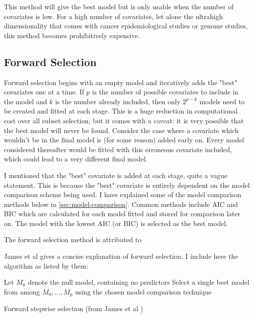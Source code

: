 This method will give the best model but is only usable when the number of covariates is low. For a high number of covariates, let alone the ultrahigh dimensionality that comes with cancer epidemiological studies or genome studies, this method becomes prohibitively expensive.

\subsection{Forward Selection}

Forward selection begins with an empty model and iteratively adds the "best" covariates one at a time. If $p$ is the number of possible covariates to include in the model and $k$ is the number already included, then only $2^{p-k}$ models need to be created and fitted at each stage. This is a huge reduction in computational cost over all subset selection, but it comes with a caveat: it is very possible that the best model will never be found. Consider the case where a covariate which wouldn't be in the final model is (for some reason) added early on. Every model considered thereafter would be fitted with this erroneous covariate included, which could lead to a very different final model.

I mentioned that the "best" covariate is added at each stage, quite a vague statement. This is because the "best" covariate is entirely dependent on the model comparison scheme being used. I have explained some of the model comparison methods below in \cref{sec:model-comparison}. Common methods include AIC and BIC which are calculated for each model fitted and stored for comparison later on. The model with the lowest AIC (or BIC) is selected as the best model.

The forward selection method is attributed to 

James et al  gives a concise explanation of forward selection. I include here the algorithm as listed by them:

\begin{algorithm}[H]
    Let $M_0$ denote the null model, containing no predictors\;
    Select a single best model from among $M_0,\ldots,M_p$ using the chosen model comparison technique\;
    \caption{Forward stepwise selection (from James et al )}\label{alg:forward-stepwise-selection}
\end{algorithm}

